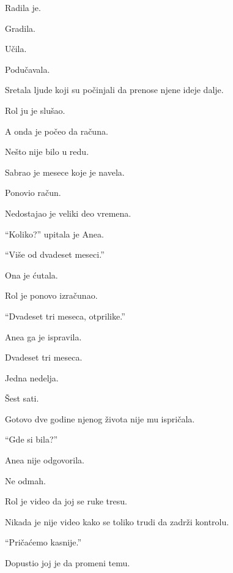\bigskip

Radila je.

Gradila.

Učila.

Podučavala.

Sretala ljude koji su počinjali da prenose njene ideje dalje.

\bigskip

Rol ju je slušao.

A onda je počeo da računa.

\bigskip

Nešto nije bilo u redu.

\bigskip

Sabrao je mesece koje je navela.

Ponovio račun.

\bigskip

Nedostajao je veliki deo vremena.

\bigskip

``Koliko?'' upitala je Anea.

``Više od dvadeset meseci.''

\bigskip

Ona je ćutala.

\bigskip

Rol je ponovo izračunao.

``Dvadeset tri meseca, otprilike.''

\bigskip

Anea ga je ispravila.

Dvadeset tri meseca.

Jedna nedelja.

Šest sati.

\bigskip

Gotovo dve godine njenog života nije mu ispričala.

\bigskip

``Gde si bila?''

\bigskip

Anea nije odgovorila.

Ne odmah.

\bigskip

Rol je video da joj se ruke tresu.

Nikada je nije video kako se toliko trudi da zadrži kontrolu.

\bigskip

``Pričaćemo kasnije.''

\bigskip

Dopustio joj je da promeni temu.

